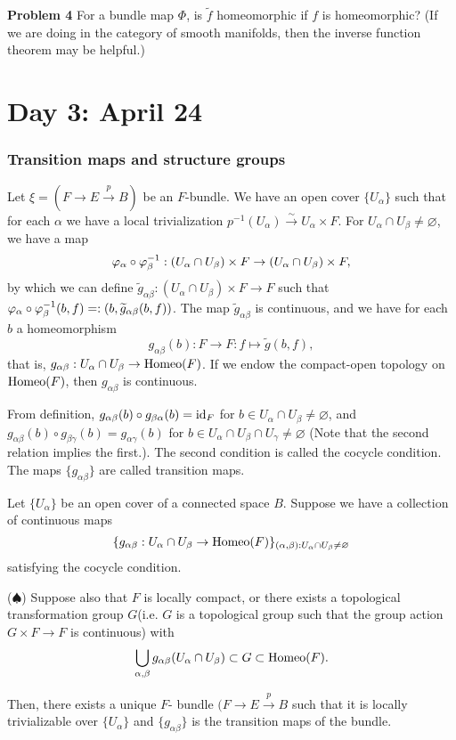 \documentclass{../../../small}
\begin{document}
\textbf{Problem 4} For a bundle map $\Phi$, is $\tilde f$ homeomorphic if $f$ is homeomorphic? (If we are doing in the category of smooth manifolds, then the inverse function theorem may be helpful.)


\newpage
\section{Day 3: April 24}


\subsubsection*{Transition maps and structure groups}
Let $\xi=(F\to E\xrightarrow{p}B)$ be an $F$-bundle.
We have an open cover $\{U_\alpha\}$ such that for each $\alpha$ we have a local trivialization $p^{-1}(U_\alpha)\xrightarrow{\sim}U_\alpha\times F$.
For $U_\alpha\cap U_\beta\ne\varnothing$, we have a map
\[\varphi_\alpha\circ\varphi_\beta^{-1}:(U_\alpha\cap U_\beta)\times F\to(U_\alpha\cap U_\beta)\times F,\]
by which we can define $\tilde g_{\alpha\beta}:(U_\alpha\cap U_\beta)\times F\to F$ such that $\varphi_\alpha\circ\varphi_\beta^{-1}(b,f)=:(b,\widetilde g_{\alpha\beta}(b,f))$.
The map $\tilde g_{\alpha\beta}$ is continuous, and we have for each $b$ a homeomorphism
\[g_{\alpha\beta}(b):F\to F:f\mapsto\tilde g(b,f),\]
that is, $g_{\alpha\beta}:U_\alpha\cap U_\beta\to\operatorname{Homeo}(F)$.
If we endow the compact-open topology on $\operatorname{Homeo}(F)$, then $g_{\alpha\beta}$ is continuous.

From definition, $g_{\alpha\beta}(b)\circ g_{\beta\alpha}(b)=\operatorname{id}_F$ for $b\in U_\alpha\cap U_\beta\ne\varnothing$, and $g_{\alpha\beta}(b)\circ g_{\beta\gamma}(b)=g_{\alpha\gamma}(b)$ for $b\in U_\alpha\cap U_\beta\cap U_\gamma\ne\varnothing$
(Note that the second relation implies the first.).
The second condition is called the cocycle condition.
The maps $\{g_{\alpha\beta}\}$ are called transition maps.

\setcounter{section}{2}
\setcounter{thm}{4}
\begin{thm}
Let $\{U_\alpha\}$ be an open cover of a connected space $B$.
Suppose we have a collection of continuous maps
\[\{g_{\alpha\beta}:U_\alpha\cap U_\beta\to\operatorname{Homeo}(F)\}_{(\alpha,\beta):U_\alpha\cap U_\beta\ne\varnothing}\] satisfying the cocycle condition.

($\spadesuit$) Suppose also that $F$ is locally compact, or there exists a topological transformation group $G$(i.e. $G$ is a topological group such that the group action $G\times F\to F$ is continuous) with
\[\bigcup_{\alpha,\beta}g_{\alpha\beta}(U_\alpha\cap U_\beta)\subset G\subset\operatorname{Homeo}(F).\]

Then, there exists a unique $F$- bundle $(F\to E\xrightarrow{p}B$ such that it is locally trivializable over $\{U_\alpha\}$ and $\{g_{\alpha\beta}\}$ is the transition maps of the bundle.
\end{thm}
\end{document}

